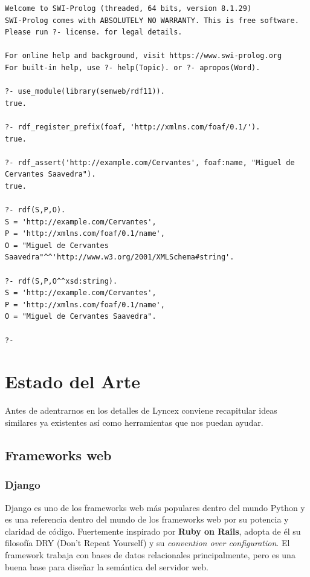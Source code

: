 \documentclass[12pt]{report} %
\begin{document}
\begin{adjustbox}{width=\textwidth,keepaspectratio}
\begin{lstlisting}
Welcome to SWI-Prolog (threaded, 64 bits, version 8.1.29)
SWI-Prolog comes with ABSOLUTELY NO WARRANTY. This is free software.
Please run ?- license. for legal details.

For online help and background, visit https://www.swi-prolog.org
For built-in help, use ?- help(Topic). or ?- apropos(Word).

?- use_module(library(semweb/rdf11)).
true.

?- rdf_register_prefix(foaf, 'http://xmlns.com/foaf/0.1/').
true.

?- rdf_assert('http://example.com/Cervantes', foaf:name, "Miguel de Cervantes Saavedra").
true.

?- rdf(S,P,O).
S = 'http://example.com/Cervantes',
P = 'http://xmlns.com/foaf/0.1/name',
O = "Miguel de Cervantes Saavedra"^^'http://www.w3.org/2001/XMLSchema#string'.

?- rdf(S,P,O^^xsd:string).
S = 'http://example.com/Cervantes',
P = 'http://xmlns.com/foaf/0.1/name',
O = "Miguel de Cervantes Saavedra".

?- 
\end{lstlisting}
\end{adjustbox}


\chapter{Estado del Arte}

Antes de adentrarnos en los detalles de Lyncex conviene recapitular ideas similares ya existentes así como herramientas que nos puedan ayudar. 

\section{Frameworks web}

\subsection{Django}
Django es uno de los frameworks web más populares dentro del mundo Python y es una referencia dentro del mundo de los frameworks web por su potencia y claridad de código.\cite{django}
Fuertemente inspirado por \textbf{Ruby on Rails}, adopta de él su filosofía DRY (Don't Repeat Yourself) y su \textit{convention over configuration}.
El framework trabaja con bases de datos relacionales principalmente, pero es una buena base para diseñar la semántica del servidor web.
\end{document}
